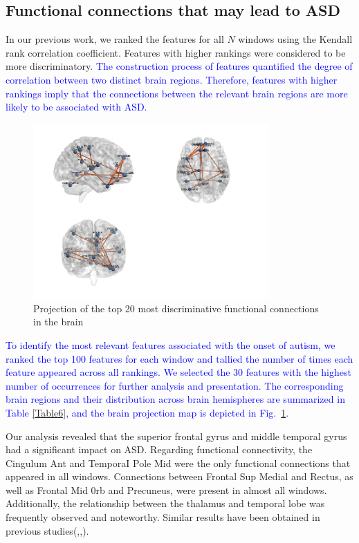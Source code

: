 \documentclass[a4paper]{cas-dc}
\newcommand{\figref}[1]{Fig.~\ref{#1}}
\begin{document}
\subsection{Functional connections that may lead to ASD}
In our previous work, we ranked the features for all $N$ windows using the Kendall rank correlation coefficient. Features with higher rankings were considered to be more discriminatory. \textcolor{blue}{The construction process of features quantified the degree of correlation between two distinct brain regions. Therefore, features with higher rankings imply that the connections between the relevant brain regions are more likely to be associated with ASD.}

\begin{figure}[h]
	\centering
	\includegraphics[width=0.8\textwidth]{imgs/brain.png}
	\caption{Projection of the top 20 most discriminative functional connections in the brain}
	\label{fig3}
\end{figure} 

\textcolor{blue}{To identify the most relevant features associated with the onset of autism, we ranked the top 100 features for each window and tallied the number of times each feature appeared across all rankings. We selected the 30 features with the highest number of occurrences for further analysis and presentation. The corresponding brain regions and their distribution across brain hemispheres are summarized in Table \ref{Table6}, and the brain projection map is depicted in \figref{fig3}.}

Our analysis revealed that the superior frontal gyrus and middle temporal gyrus had a significant impact on ASD. Regarding functional connectivity, the Cingulum Ant and TemporaI Pole Mid were the only functional connections that appeared in all windows. Connections between Frontal Sup Medial and Rectus, as well as Frontal Mid 0rb and Precuneus, were present in almost all windows. Additionally, the relationship between the thalamus and temporal lobe was frequently observed and noteworthy. Similar results have been obtained in previous studies(\cite{wang2021autistic},\cite{monk2009abnormalities},\cite{xu2020specific}).
\end{document}
